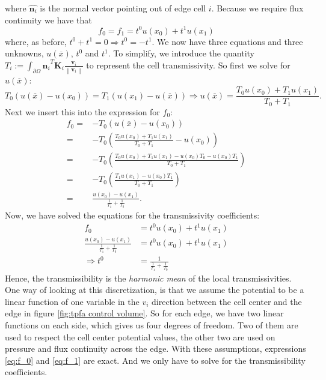 \documentclass[../Main/main.tex]{subfiles}
\begin{document}
	where $\hat{\bm{n}_i}$ is the normal vector pointing out of edge cell $i$.
	Because we require flux continuity we have that 
	\begin{equation}
		f_0 = f_1 = t^0 u(x_0) + t^1 u(x_1)
	\end{equation}
	where, as before, $t^0 + t^1 = 0 \Rightarrow t^0 = -t^1$. We now have three equations and three unknowns, $u(\overline{x})$, $t^0$ and $t^1$. To simplify, we introduce the quantity $T_i := \int_{\partial \Omega} \hat{\bm{n}_i}^T \bm{K}_i  \frac{\bm{v}_i}{\left \| \bm{v}_i \right \|} $ to represent the cell transmissivity. So first we solve for $u(\overline{x})$:
	\begin{equation}
		T_0(u(\overline{x})-u(x_0)) = T_1(u(x_1)-u(\overline{x})) \Rightarrow u(\overline{x}) = \frac{T_0 u(x_0) + T_1 u(x_1)}{T_0 + T_1}.
	\end{equation}
	Next we insert this into the expression for $f_0$:
	\begin{equation}
		\begin{aligned}
			f_0 =& -T_0(u(\overline{x})-u(x_0)) \\
			=& -T_0(\frac{T_0 u(x_0) + T_1 u(x_1)}{T_0 + T_1} - u(x_0))\\
			=& -T_0(\frac{T_0 u(x_0) + T_1 u(x_1) - u(x_0)T_0 - u(x_0)T_1}{T_0 + T_1}) \\
			=& -T_0(\frac{ T_1 u(x_1)  - u(x_0)T_1}{T_0 + T_1})\\
			=& \frac{u(x_0)-u(x_1)}{\frac{1}{T_1} + \frac{1}{T_0}}.
		\end{aligned}
	\end{equation}
	Now, we have solved the equations for the transmissivity coefficients:
	\begin{equation}\label{eq:harmonic mean}
		\begin{aligned}
			f_0 &= t^0 u(x_0) + t^1 u(x_1) \\
			\frac{u(x_0)-u(x_1)}{\frac{1}{T_1} + \frac{1}{T_0}} &= t^0 u(x_0) + t^1 u(x_1) \\
			\Rightarrow t^0 &= \frac{1}{\frac{1}{T_1} + \frac{1}{T_0}}
		\end{aligned}
	\end{equation} 
	Hence, the transmissibility is the \emph{harmonic mean} of the local transmissivities. One way of looking at this discretization, is that we assume the potential to be a linear function of one variable in the $v_i$ direction between the cell center and the edge in figure \ref{fig:tpfa control volume}. So for each edge, we have two linear functions on each side, which gives us four degrees of freedom. Two of them are used to respect the cell center potential values, the other two are used on pressure and flux continuity across the edge. With these assumptions, expressions \eqref{eq:f_0} and \eqref{eq:f_1} are exact. And we only have to solve for the transmissibility coefficients.\par
\end{document}
